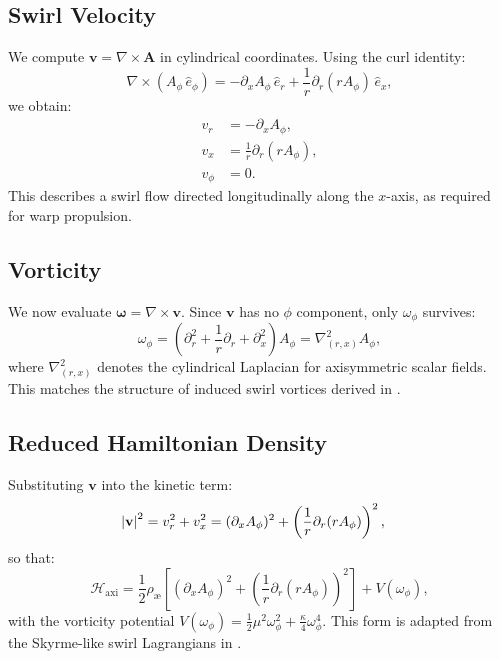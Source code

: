 \documentclass[preprint,notitlepage]{revtex4-2}
\begin{document}
        \subsection*{Swirl Velocity}
        We compute $\mathbf{v} = \nabla \times \mathbf{A}$ in cylindrical coordinates. Using the curl identity:
        \begin{equation}
          \nabla \times (A_\phi\, \hat{e}_\phi) = -\partial_x A_\phi \, \hat{e}_r + \frac{1}{r} \partial_r(r A_\phi) \, \hat{e}_x,
        \end{equation}
        we obtain:
        \begin{align}
          v_r &= -\partial_x A_\phi, \\
          v_x &= \frac{1}{r} \partial_r(r A_\phi), \\
          v_\phi &= 0.
        \end{align}
        This describes a swirl flow directed longitudinally along the $x$-axis, as required for warp propulsion.

        \subsection*{Vorticity}
        We now evaluate $\boldsymbol{\omega} = \nabla \times \mathbf{v}$. Since $\mathbf{v}$ has no $\phi$ component, only $\omega_\phi$ survives:
        \begin{equation}
          \omega_\phi = (\partial_r^2 + \frac{1}{r}\partial_r + \partial_x^2) A_\phi = \nabla^2_{(r,x)} A_\phi,
        \end{equation}
        where $\nabla^2_{(r,x)}$ denotes the cylindrical Laplacian for axisymmetric scalar fields. This matches the structure of induced swirl vortices derived in \cite{VAM-4, VAM-10}.

        \subsection*{Reduced Hamiltonian Density}
        Substituting $\mathbf{v}$ into the kinetic term:
        \begin{align}
          \abs{\mathbf{v}}^2 &= v_r^2 + v_x^2 = (\partial_x A_\phi)^2 + \left( \frac{1}{r} \partial_r (r A_\phi) \right)^2,
        \end{align}
        so that:
        \begin{equation}
          \mathcal{H}_{\text{axi}} = \frac{1}{2}\rho_{æ}\left[ (\partial_x A_\phi)^2 + \left( \frac{1}{r} \partial_r(r A_\phi) \right)^2 \right] + V(\omega_\phi),
        \end{equation}
        with the vorticity potential $V(\omega_\phi) = \frac{1}{2} \mu^2 \omega_\phi^2 + \frac{\kappa}{4} \omega_\phi^4$. This form is adapted from the Skyrme-like swirl Lagrangians in \cite{VAM-2}.
\end{document}
